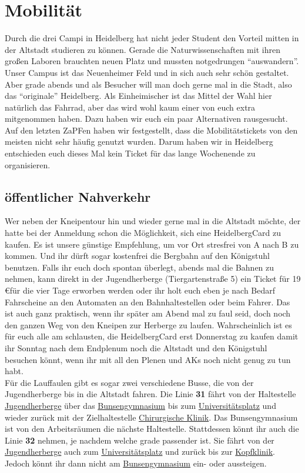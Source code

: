 \section{Mobilität}
  Durch die drei Campi in Heidelberg hat nicht jeder Student den Vorteil mitten
  in der Altstadt studieren zu können. Gerade die Naturwissenschaften mit ihren großen
  Laboren brauchten neuen Platz und mussten notgedrungen ``auswandern''. Unser Campus ist
  das Neuenheimer Feld und in sich auch sehr schön gestaltet.
  Aber grade abends und als Besucher will man doch gerne mal in die Stadt, also das
  ``originale'' Heidelberg.
  Als Einheimischer ist das Mittel der Wahl hier natürlich das Fahrrad, aber das wird wohl
  kaum einer von euch extra mitgenommen haben. Dazu haben wir euch ein paar Alternativen
  rausgesucht. Auf den letzten ZaPFen haben wir festgestellt, dass die Mobilitätstickets von den meisten
  nicht sehr häufig genutzt wurden. Darum haben wir in Heidelberg entschieden euch
  dieses Mal kein Ticket für das lange Wochenende zu organisieren.

  \subsection{öffentlicher Nahverkehr}
    Wer neben der Kneipentour hin und wieder gerne mal in die Altstadt möchte, der hatte bei
    der Anmeldung schon die Möglichkeit, sich eine HeidelbergCard zu kaufen.
    Es ist unsere günstige Empfehlung, um vor Ort stresfrei von A nach B zu kommen.
    Und ihr dürft sogar kostenfrei die Bergbahn auf den Königstuhl benutzen.
    Falls ihr euch doch spontan überlegt, abends mal die Bahnen zu nehmen, kann
    direkt in der Jugendherberge (Tiergartenstraße 5) ein Ticket für 19 \euro für die vier Tage
    erworben werden oder ihr holt euch eben je nach Bedarf Fahrscheine an den Automaten
    an den Bahnhaltestellen oder beim Fahrer.
    Das ist auch ganz praktisch, wenn ihr später am Abend mal zu faul seid, doch
    noch den ganzen Weg von den Kneipen zur Herberge zu laufen.
    Wahrscheinlich ist es für euch alle am schlausten, die HeidelbergCard erst
    Donnerstag zu kaufen damit ihr Sonntag nach dem Endplenum noch die Altstadt und
    den Königstuhl besuchen könnt, wenn ihr mit all den Plenen und
    AKs noch nicht genug zu tun habt. \\
    Für die Lauffaulen gibt es sogar zwei verschiedene Busse, die von der Jugendherberge
    bis in die Altstadt fahren. Die Linie \textbf{31} fährt von der Haltestelle
    \underline{Jugendherberge} über das \underline{Bunsengymnasium} bis zum
    \underline{Universitätsplatz} und wieder zurück mit der Zielhaltestelle
    \underline{Chirurgische Klinik}. Das Bunsengymnasium ist von den Arbeitsräumen
    die nächste Haltestelle. Stattdessen könnt ihr auch die Linie \textbf{32} nehmen,
    je nachdem welche grade passender ist. Sie fährt von der \underline{Jugendherberge}
    auch zum \underline{Universitätsplatz} und zurück bis zur \underline{Kopfklinik}.
    Jedoch könnt ihr dann nicht am \underline{Bunsengymnasium} ein- oder aussteigen.

